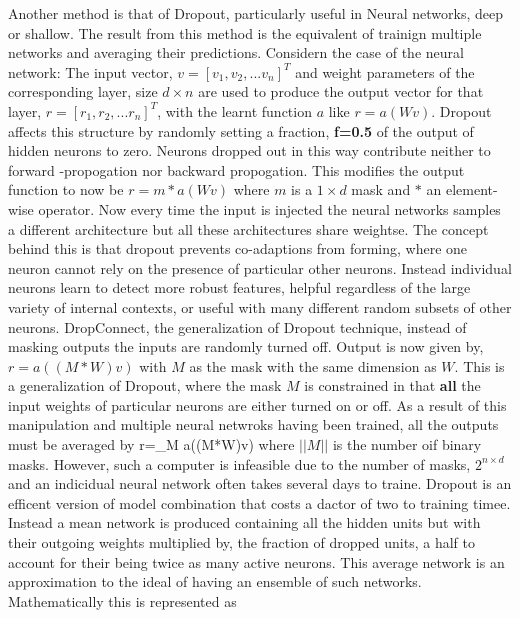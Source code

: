 Another method is that of Dropout\citep{hinton2012improving}, particularly useful in Neural networks, deep or shallow.
The result from this method is the equivalent of trainign multiple networks and averaging their predictions.
Considern the case of the neural network:
The input vector, $v=[v_1,v_2,...v_n]^T$ and weight parameters of the corresponding layer, size $d\times n$ are used to produce the output vector for that layer, $r=[r_1,r_2,...r_n]^T$, with the learnt function $a$ like $r=a(Wv)$.
Dropout affects this structure by randomly setting a fraction, \textbf{f=0.5} of the output of hidden neurons to zero.
Neurons dropped out in this way contribute neither to forward -propogation nor backward propogation.
This modifies the output function to now be $r=m*a(Wv)$ where $m$ is a $1\times d$ mask and $*$ an element-wise operator\citep{goyal2014object}.
Now every time the input is injected the neural networks samples a different architecture but all these architectures share weightse\citep{krizhevsky2012imagenet}.
The concept behind this is that dropout prevents co-adaptions from forming, where one neuron cannot rely on the presence of particular other neurons.
Instead individual neurons learn to detect more robust features, helpful regardless of the large variety of internal contexts, or useful with many different random subsets of other neurons.
DropConnect, the generalization of Dropout technique, instead of masking outputs the inputs are randomly turned off.
Output is now given by, $r=a((M*W)v)$ with $M$ as the mask with the same dimension as $W$.
This is a generalization of Dropout, where the mask $M$ is constrained in that \textbf{all} the input weights of particular neurons are either turned on or off\citep{goyal2014object}.
As a result of this manipulation and multiple neural netwroks having been trained, all the outputs must be averaged by
\be
r=\sum_M a((M*W)v)
\ee
where $||M||$ is the number oif binary masks.
However, such a computer is infeasible due to the number of masks, $2^{n\times d}$\citep{goyal2014object} and an indicidual neural network often takes several days to traine\citep{krizhevsky2012imagenet}.
Dropout is an efficent version of model combination that costs a dactor of two to training timee\citep{krizhevsky2012imagenet}.
Instead a mean network is produced containing all the hidden units but with their outgoing weights multiplied by, the fraction of dropped units, a half to account for their being twice as many active neurons\citep{goyal2014object}.
This average network is an approximation to the ideal of having an ensemble of such networks.
Mathematically this is represented as

